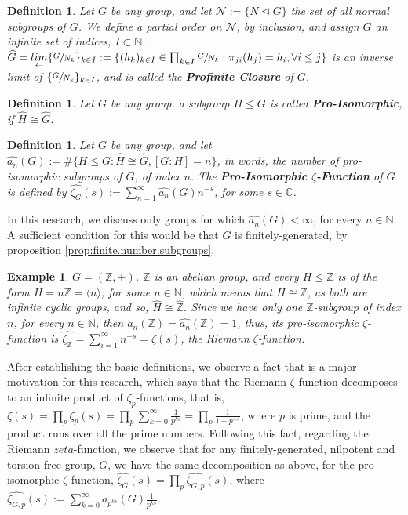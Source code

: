 \documentclass[12pt]{article}
\newtheorem{definition}[theorem]{Definition}
\newtheorem{example}[theorem]{Example}
\begin{document}
\begin{definition}
\label{def:profinite.closure}
Let $G$ be any group, and let $\mathcal{N}:=\{N\trianglelefteq G\}$ the set of all normal subgroups of $G$. We define a partial order on $\mathcal{N}$, by inclusion, and assign $G$ an infinite set of indices, $I\subset\mathbb{N}$.
$\widehat{G}=\underset{\leftarrow}{lim}\{\sfrac{G}{N_k}\}_{k\in I}:=\{(h_k)_{k\in I}\in\prod_{k\in I}\sfrac{G}{N_k} : \pi_{ji}(h_j)=h_i,\forall i\leq j\}$ is an inverse limit of $\{\sfrac{G}{N_k}\}_{k\in I}$, and is called the \textbf{Profinite Closure} of $G$.
\end{definition}
\begin{definition}
\label{def:pro.isomorphic}
Let $G$ be any group. a subgroup $H\leq G$ is called \textbf{Pro-Isomorphic}, if $\widehat{H}\cong\widehat{G}$.
\end{definition}
\begin{definition}
\label{def:zeta.pro.isomorphic}
Let $G$ be any group, and let $\hat{a_n}(G):=\#\{H\leq G : \widehat{H}\cong\widehat{G}, [G:H]=n\}$, in words, the number of pro-isomorphic subgroups of $G$, of index $n$. The \textbf{Pro-Isomorphic $\zeta$-Function} of $G$ is defined by $\hat{\zeta_G}(s):=\sum_{n=1}^{\infty}\hat{a_n}(G)n^{-s}$, for some $s\in\mathbb{C}$. 
\end{definition}
In this research, we discuss only groups for which $\hat{a_n}(G)<\infty$, for every $n\in\mathbb{N}$. A sufficient condition for this would be that $G$ is finitely-generated, by proposition \ref{prop:finite.number.subgroups}.
\begin{example}
$G=(\mathbb{Z},+)$. $\mathbb{Z}$ is an abelian group, and every $H\leq \mathbb{Z}$ is of the form $H=n\mathbb{Z}=\langle n\rangle$, for some $n\in\mathbb{N}$, which means that $H\cong \mathbb{Z}$, as both are infinite cyclic groups, and so, $\widehat{H}\cong\widehat{\mathbb{Z}}$. Since we have only one $\mathbb{Z}$-subgroup of index $n$, for every $n\in\mathbb{N}$, then $a_n(\mathbb{Z})=\hat{a_n}(\mathbb{Z})=1$, thus, its pro-isomorphic $\zeta$-function is $\hat{\zeta_{\mathbb{Z}}}=\sum_{i=1}^{\infty}n^{-s}=\zeta(s)$, the Riemann $\zeta$-function. 
\end{example}
After establishing the basic definitions, we observe a fact that is a major motivation for this research, which says that the Riemann $\zeta$-function decomposes to an infinite product of $\zeta_p$-functions, that is, $\zeta(s)=\prod_p\zeta_p(s)=\prod_p\sum_{k=0}^\infty\frac{1}{p^{ks}}=\prod_p\frac{1}{1-p^{-s}}$, where $p$ is prime, and the product runs over all the prime numbers. Following this fact, regarding the Riemann $zeta$-function, we observe that for any finitely-generated, nilpotent and torsion-free group, $G$, we have the same decomposition as above, for the pro-isomorphic $\zeta$-function, $\widehat{\zeta_G}(s)=\prod_p\widehat{\zeta_{G,p}}(s)$, where $\widehat{\zeta_{G,p}}(s):=\sum_{k=0}^\infty a_{p^{ks}}(G)\frac{1}{p^{ks}}$
\end{document}
